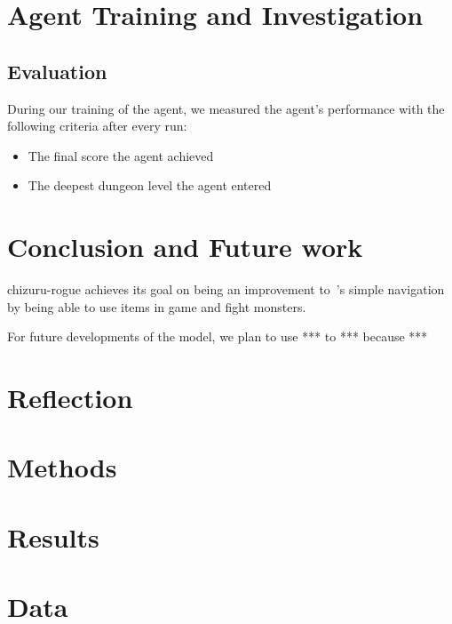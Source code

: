 \documentclass[11pt,a4paper]{article}
\begin{document}
    \section{Agent Training and Investigation}
    \subsection{Evaluation}
    During our training of the agent, we measured the agent's performance with the following criteria after every run:
    \begin{itemize}
        \item The final score the agent achieved
        \item The deepest dungeon level the agent entered
    \end{itemize}

    \section{Conclusion and Future work}
    chizuru-rogue achieves its goal on being an improvement to~\cite{asperti18}'s simple navigation by being able to use items in game and fight monsters.

    For future developments of the model, we plan to use *** to *** because ***

    \section{Reflection}

    \medskip

    
    

    \medskip

    \appendix
    \section{Methods}
    \section{Results}
    \section{Data}
\end{document}
